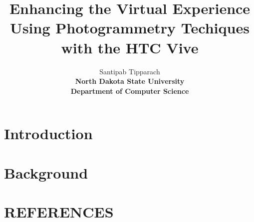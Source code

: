 \documentclass[10pt,a4paper]{article}
\title{\textbf{\Huge Enhancing the Virtual Experience Using Photogrammetry Techiques\\
		\Large with the HTC Vive }}
\author{Santipab Tipparach\\
	\textbf{North Dakota State University}\\\textbf{Department of Computer Science}}
\begin{document}
	\maketitle
	
	\begin{abstract}

		
	\end{abstract}
	
	\section{Introduction}

	
	\section{Background}



	\section*{REFERENCES}
	\begin{thebibliography}{99}
		

	\end{thebibliography}
\end{document}
